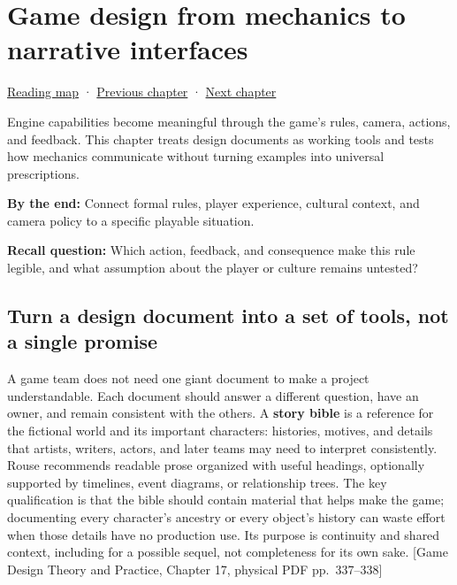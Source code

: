 \chapter{Game design from mechanics to narrative interfaces}\label{06-engine-ii-ch046-game-design-from-mechanics-to-narrative-interfaces}\hypertarget{06-engine-ii-ch046}{}\label{stagechapter:06-engine-ii-ch046}

\hypertarget{06-engine-ii-ch046-game-design-from-mechanics-to-narrative-interfaces}{}

\hyperref[volume-reading-map]{Reading map} · \hyperref[06-engine-ii-ch041]{Previous chapter} · \hyperref[06-engine-ii-ch047-narrative-simulation-and-ai-in-playable-worlds]{Next chapter}

Engine capabilities become meaningful through the game's rules, camera, actions, and feedback. This chapter treats design documents as working tools and tests how mechanics communicate without turning examples into universal prescriptions.

\textbf{By the end:} Connect formal rules, player experience, cultural context, and camera policy to a specific playable situation.

\textbf{Recall question:} Which action, feedback, and consequence make this rule legible, and what assumption about the player or culture remains untested?

\section{Turn a design document into a set of tools, not a single promise}\label{06-engine-ii-ch046-turn-a-design-document-into-a-set-of-tools-not-a-single-promise}

\hypertarget{06-engine-ii-ch046-turn-a-design-document-into-a-set-of-tools-not-a-single-promise}{}

A game team does not need one giant document to make a project understandable. Each document should answer a different question, have an owner, and remain consistent with the others. A \textbf{story bible} is a reference for the fictional world and its important characters: histories, motives, and details that artists, writers, actors, and later teams may need to interpret consistently. Rouse recommends readable prose organized with useful headings, optionally supported by timelines, event diagrams, or relationship trees. The key qualification is that the bible should contain material that helps make the game; documenting every character's ancestry or every object's history can waste effort when those details have no production use. Its purpose is continuity and shared context, including for a possible sequel, not completeness for its own sake. {[}Game Design Theory and Practice, Chapter 17, physical PDF pp.~337--338{]}


